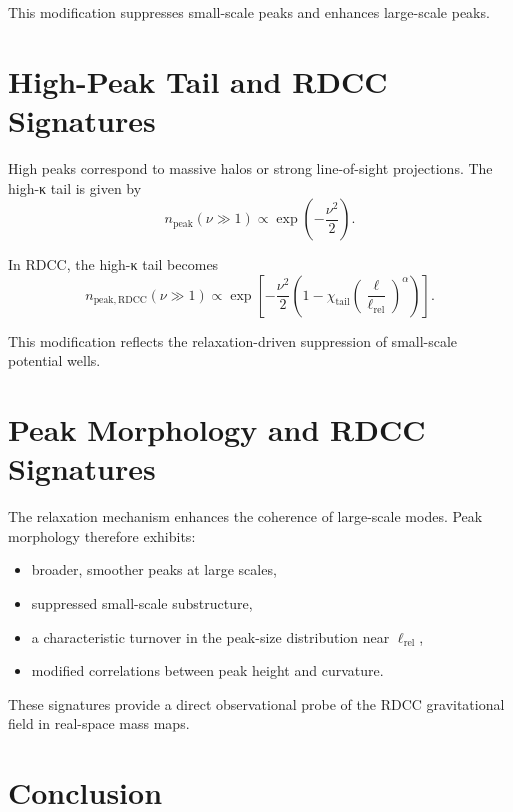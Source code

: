 \documentclass[11pt,a4paper]{article}
\begin{document}
This modification suppresses small-scale peaks and enhances large-scale peaks.
\section{High-Peak Tail and RDCC Signatures}

High peaks correspond to massive halos or strong line-of-sight projections. The 
high-κ tail is given by
\begin{equation}
    n_{\mathrm{peak}}(\nu \gg 1)
    \propto \exp\left(-\frac{\nu^{2}}{2}\right).
\end{equation}

In RDCC, the high-κ tail becomes
\begin{equation}
    n_{\mathrm{peak,RDCC}}(\nu \gg 1)
    \propto
    \exp\left[
      -\frac{\nu^{2}}{2}
      \left(
        1 - \chi_{\mathrm{tail}}
        \left(\frac{\ell}{\ell_{\mathrm{rel}}}\right)^{\alpha}
      \right)
    \right].
\end{equation}

This modification reflects the relaxation-driven suppression of small-scale 
potential wells.
\section{Peak Morphology and RDCC Signatures}

The relaxation mechanism enhances the coherence of large-scale modes. Peak 
morphology therefore exhibits:

\begin{itemize}
    \item broader, smoother peaks at large scales,
    \item suppressed small-scale substructure,
    \item a characteristic turnover in the peak-size distribution near $\ell_{\mathrm{rel}}$,
    \item modified correlations between peak height and curvature.
\end{itemize}

These signatures provide a direct observational probe of the RDCC gravitational 
field in real-space mass maps.
\section{Conclusion}
\end{document}
